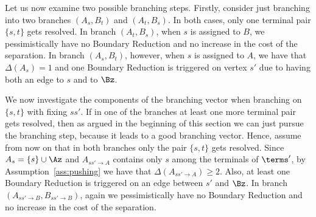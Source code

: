 Let us now examine two possible branching steps. Firstly, consider just branching into two branches $(A_s,B_t)$ and $(A_t,B_s)$. In both cases, only one terminal pair $\{s,t\}$ gets resolved. In branch $(A_t,B_s)$, when $s$ is assigned to $B$, we pessimistically have no Boundary Reduction and no increase in the cost of the separation. In branch $(A_s,B_t)$, however, when $s$ is assigned to $A$, we have that $\Delta(A_s)=1$ and one Boundary Reduction is triggered on vertex $s'$ due to having both an edge to $s$ and to $\Bz$.

We now investigate the components of the branching vector when branching on $\{s,t\}$ with fixing $ss'$. If in one of the branches at least one more terminal pair gets resolved, then as argued in the beginning of this section we can just pursue the branching step, because it leads to a good branching vector. Hence, assume from now on that in both branches only the pair $\{s,t\}$ gets resolved. Since $A_s=\{s\}\cup \Az$ and $A_{ss'\to A}$ contains only $s$ among the terminals of $\terms'$, by Assumption~\ref{ass:pushing} we have that $\Delta(A_{ss'\to A})\geq 2$. Also, at least one Boundary Reduction is triggered on an edge between $s'$ and $\Bz$. In branch $(A_{ss'\to B},B_{ss'\to B})$, again we pessimistically have no Boundary Reduction and no increase in the cost of the separation.

